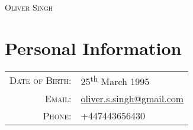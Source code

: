 \documentclass[a4paper]{article}
\begin{document}
\pagestyle{empty}
\bigbreak
{\center \textsc{\huge Oliver Singh}\\}

\section*{Personal Information} 
\begin{tabular}{r l}
\textsc{Date of Birth:}     & 25\textsuperscript{th} March 1995\\ 
\textsc{Email:} & \href{mailto:oliver.s.singh@gmail.com}{oliver.s.singh@gmail.com}\\
\textsc{Phone:} & {+447443656430}\\
\end{tabular}


\end{document}
